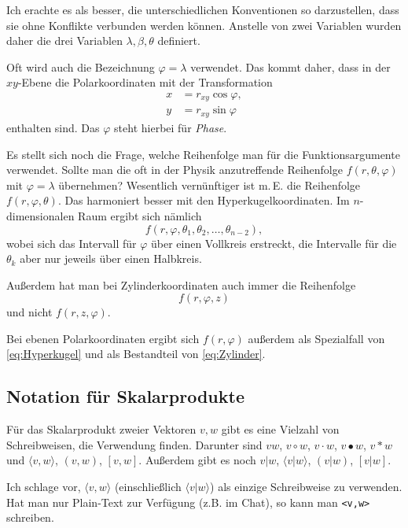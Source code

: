 \documentclass[a4paper,11pt,fleqn]{article}
\begin{document}
Ich erachte es als besser, die unterschiedlichen Konventionen so
darzustellen, dass sie ohne Konflikte verbunden werden können.
Anstelle von zwei Variablen wurden daher die drei Variablen
$\lambda,\beta,\theta$ definiert.

Oft wird auch die Bezeichnung $\varphi=\lambda$ verwendet.
Das kommt daher, dass in der $xy$-Ebene die Polarkoordinaten
mit der Transformation
\begin{equation}
  \begin{split}
  x &= r_{xy}\cos\varphi,\\
  y &= r_{xy}\sin\varphi
  \end{split}
\end{equation}
enthalten sind. Das $\varphi$ steht hierbei für \emph{Phase}.

Es stellt sich noch die Frage, welche Reihenfolge man für die
Funktionsargumente verwendet. Sollte man die oft in
der Physik anzutreffende Reihenfolge $f(r,\theta,\varphi)$
mit $\varphi=\lambda$ übernehmen? Wesentlich vernünftiger ist m.\,E.
die Reihenfolge $f(r,\varphi,\theta)$. Das harmoniert besser mit
den Hyperkugelkoordinaten. Im $n$-dimensionalen Raum ergibt sich
nämlich
\begin{equation}\label{eq:Hyperkugel}
f(r,\varphi,\theta_1,\theta_2,\ldots,\theta_{n-2}),
\end{equation}
wobei sich das Intervall für $\varphi$ über einen Vollkreis
erstreckt, die Intervalle für die $\theta_k$ aber nur jeweils
über einen Halbkreis.

Außerdem hat man bei Zylinderkoordinaten auch immer die
Reihenfolge%
\begin{equation}\label{eq:Zylinder}
f(r,\varphi,z)
\end{equation}
und nicht $f(r,z,\varphi)$.

Bei ebenen Polarkoordinaten ergibt sich $f(r,\varphi)$
außerdem als Spezialfall von \eqref{eq:Hyperkugel}
und als Bestandteil von \eqref{eq:Zylinder}.


\subsection{Notation für Skalarprodukte}
Für das Skalarprodukt zweier Vektoren $v,w$ gibt es eine Vielzahl von
Schreibweisen, die Verwendung finden. Darunter sind $vw$, $v\circ w$,
$v\cdot w$, $v\bullet w$, $v*w$ und $\langle v,w\rangle$,
$(v,w)$, $[v,w]$. Außerdem gibt es noch $v|w$, $\langle v|w\rangle$,
$(v|w)$, $[v|w]$.

Ich schlage vor, $\langle v,w\rangle$ (einschließlich
$\langle v|w\rangle$) als einzige Schreibweise zu verwenden.
Hat man nur Plain-Text zur Verfügung (z.B. im Chat), so
kann man \verb|<v,w>| schreiben.
\end{document}
